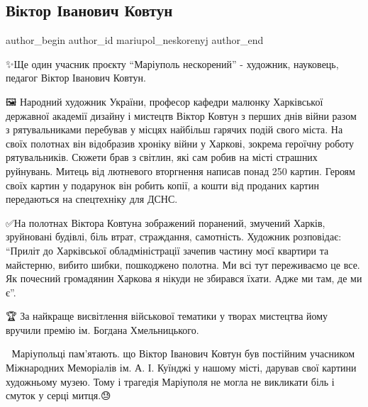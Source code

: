  
 
 
 
 

\subsection{Віктор Іванович Ковтун}
\label{sec:05_09_2023.fb.mariupol_neskorenyj.1.viktor_ivanovych_kovtun}

\ifcmt
 author_begin
   author_id mariupol_neskorenyj
 author_end
\fi

✨️Ще один учасник проєкту \enquote{Маріуполь нескорений} -  художник,
науковець, педагог  Віктор Іванович Ковтун.

🖼  Народний художник України, професор кафедри малюнку Харківської державної
академії дизайну і мистецтв  Віктор Ковтун з перших днів війни разом з
рятувальниками перебував  у місцях найбільш гарячих подій свого міста. На своїх
полотнах він відобразив хроніку війни у Харкові, зокрема героїчну роботу
рятувальників. Сюжети брав  з світлин, які сам робив на місті страшних
руйнувань. Митець від лютневого вторгнення написав понад 250 картин. Героям
своїх картин у подарунок  він робить копії, а кошти від проданих картин
передаються  на спецтехніку для ДСНС.👏

✅️На полотнах Віктора Ковтуна зображений поранений, змучений Харків, зруйновані
будівлі, біль втрат, страждання, самотність. Художник розповідає: \enquote{Приліт до
Харківської обладміністрації зачепив частину моєї квартири та майстерню, вибито
шибки, пошкоджено полотна. Ми всі тут переживаємо  це все. Як почесний
громадянин Харкова я нікуди не збирався їхати. Адже ми там, де ми є}. 

🏆  За найкраще висвітлення військової тематики у творах мистецтва  йому
вручили  премію ім. Богдана  Хмельницького. 

📍  Маріупольці пам'ятають. що Віктор Іванович Ковтун був постійним учасником
Міжнародних Меморіалів ім. А. І. Куїнджі у нашому місті, дарував свої картини
художньому музею. Тому і трагедія Маріуполя не могла  не викликати біль і
смуток у серці  митця.😓  


